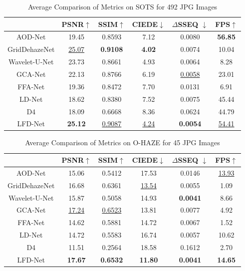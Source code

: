 \documentclass[lettersize,journal]{IEEEtran}
\begin{document}
\begin{table}[H]
    \caption{Average Comparison of Metrics on SOTS for 492 JPG Images\label{tab:sots}}
    \centering
    \begin{tabular}{cccccc}
    \hline
    &PSNR$\uparrow$ & SSIM$\uparrow$ & CIEDE$\downarrow$ & $\Delta$SSEQ $\downarrow$ & FPS$\uparrow$ \\
    \hline
    AOD-Net                 & 19.45 & 0.8593 & 7.12 & 0.0080 & \textbf{56.85} \\
    GridDehazeNet           & \underline{25.07} & \textbf{0.9108} & \textbf{4.02} & 0.0074 & 10.04 \\
    Wavelet-U-Net           & 23.73 & 0.8661 & 4.93 & 0.0064 &  8.28 \\
    GCA-Net                 & 22.13 & 0.8766 & 6.19 & \underline{0.0058} & 23.01 \\    
    FFA-Net                 & 19.36 & 0.8472 & 7.70 & 0.0131 &  6.91 \\
    LD-Net                  & 18.62 & 0.8380 & 7.52 & 0.0075 & 45.44 \\
    D4                      & 18.09 & 0.6668 & 8.36 & 0.0624 & 44.79 \\
    LFD-Net                 & \textbf{25.12} & \underline{0.9087} & \underline{4.24} & \textbf{0.0054} & \underline{54.41} \\
    \hline
    \end{tabular}
\end{table}

\begin{table}[H]
    \caption{Average Comparison of Metrics on O-HAZE for 45 JPG Images\label{tab:ohaze}}
    \centering
    \begin{tabular}{cccccc}
    \hline
    &PSNR$\uparrow$ & SSIM$\uparrow$ & CIEDE$\downarrow$ & $\Delta$SSEQ $\downarrow$ & FPS$\uparrow$ \\
    \hline
    AOD-Net        & 15.06 & 0.5412 & 17.53 & 0.0146 & \underline{13.93} \\
    GridDehazeNet  & 16.68 & 0.6361 & \underline{13.54} & 0.0055 & 1.09 \\
    Wavelet-U-Net  & 15.87 & 0.5058 & 14.93 & \textbf{0.0041} & 8.66\\
    GCA-Net        & \underline{17.24} & \underline{0.6523} & 13.81 & 0.0077 & 4.92 \\    
    FFA-Net        & 14.62 & 0.5881 & 14.72 & 0.0067 & 1.52\\
    LD-Net         & 14.72 & 0.5583 & 16.74 & 0.0057 & 10.62 \\
    D4             & 11.51 & 0.2564 & 18.58 & 0.1612 & 2.70 \\
    LFD-Net        & \textbf{17.67} & \textbf{0.6532} & \textbf{11.80} & \textbf{0.0041} & \textbf{14.65}\\
    \hline
    \end{tabular}
\end{table}
\end{document}
